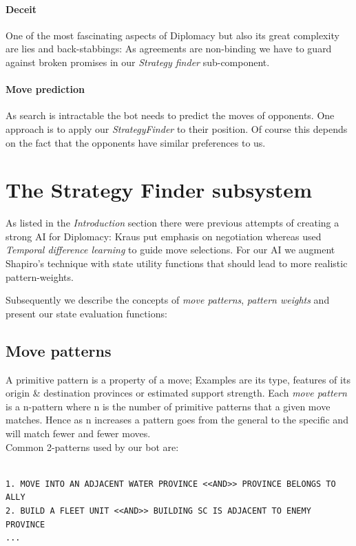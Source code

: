\documentclass[pdftex,11pt,a4paper]{report}
\begin{document}
\paragraph{Deceit}
One of the most fascinating aspects of Diplomacy but also its great
complexity are lies and back-stabbings: As agreements are non-binding
we have to guard against broken promises in our \textit{Strategy finder}
sub-component. 

\paragraph{Move prediction}
As search is intractable the bot needs to predict the moves of 
opponents. One approach is to apply our \textit{StrategyFinder}
to their position. Of course this depends on the fact that the
opponents have similar preferences to us.  

\section{The Strategy Finder subsystem}

As listed in the \textit{Introduction} section there were previous
attempts of creating a strong AI for Diplomacy: Kraus \cite{Kraus95}
put emphasis on negotiation whereas \cite{Shapiro02} used
\textit{Temporal difference learning} to guide move selections. For
our AI we augment Shapiro's technique with state utility functions
that should lead to more realistic pattern-weights.

Subsequently we describe the concepts of \textit{move patterns},
\textit{pattern weights} and present our state evaluation functions:

\subsection{Move patterns}

A primitive pattern is a property of a move; Examples are its type,
features of its origin \& destination provinces or estimated support
strength. Each \textit{move pattern} is a n-pattern where n is the
number of primitive patterns that a given move matches. Hence as n
increases a pattern goes from the general to the specific and will
match fewer and fewer moves. \\

Common 2-patterns used by our bot are:

\begin{verbatim}

1. MOVE INTO AN ADJACENT WATER PROVINCE <<AND>> PROVINCE BELONGS TO ALLY
2. BUILD A FLEET UNIT <<AND>> BUILDING SC IS ADJACENT TO ENEMY PROVINCE
...

\end{verbatim}
\end{document}
